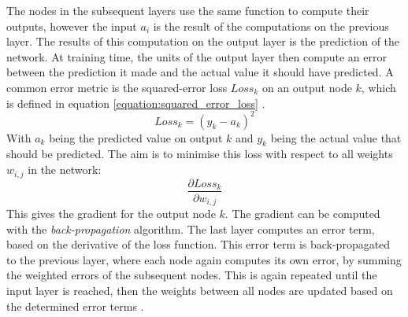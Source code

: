 The nodes in the subsequent layers use the same function to compute their outputs, however the input $a_i$ is the result of the computations on the previous layer.
The results of this computation on the output layer is the prediction of the network.
At training time, the units of the output layer then compute an error between the prediction it made and the actual value it should have predicted.
A common error metric is the squared-error loss $Loss_k$ on an output node $k$, which is defined in equation \ref{equation:squared_error_loss} \cite[p. 735]{Russel2016}.
\begin{equation}
    Loss_k=(y_k - a_k)^2
    \label{equation:squared_error_loss}
\end{equation}
With $a_k$ being the predicted value on output $k$ and $y_k$ being the actual value that should be predicted.
The aim is to minimise this loss with respect to all weights $w_{i,j}$ in the network:
\begin{equation}
    \frac{\partial Loss_k}{\partial w_{i,j}}    
\end{equation}
This gives the gradient for the output node $k$.
The gradient can be computed with the \textit{back-propagation} algorithm.
The last layer computes an error term, based on the derivative of the loss function.
This error term is back-propagated to the previous layer, where each node again computes its own error, by summing the weighted errors of the subsequent nodes.
This is again repeated until the input layer is reached, then the weights between all nodes are updated based on the determined error terms \cite[p. 734]{Russel2016}.

